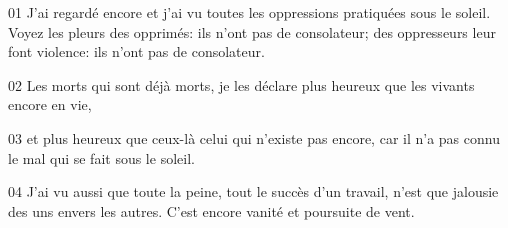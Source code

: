 01 J’ai regardé encore et j’ai vu toutes les oppressions pratiquées sous le soleil. Voyez les pleurs des opprimés: ils n’ont pas de consolateur; des oppresseurs leur font violence: ils n’ont pas de consolateur.

02 Les morts qui sont déjà morts, je les déclare plus heureux que les vivants encore en vie,

03 et plus heureux que ceux-là celui qui n’existe pas encore, car il n’a pas connu le mal qui se fait sous le soleil.

04 J’ai vu aussi que toute la peine, tout le succès d’un travail, n’est que jalousie des uns envers les autres. C’est encore vanité et poursuite de vent.

